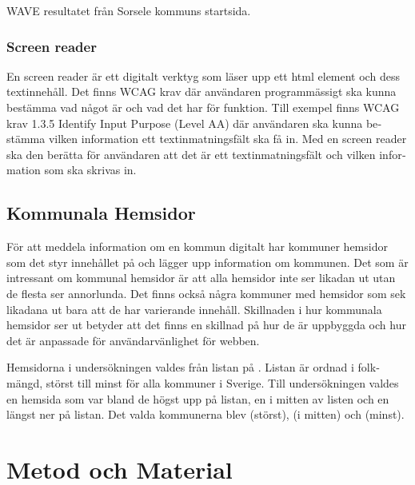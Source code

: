 \documentclass[11p]{article}
\begin{document}
\begin{otherlanguage}{swedish}
\begin{center}
    WAVE resultatet från Sorsele kommuns startsida.
    \end{center}

    \subsubsection{Screen reader}

    En screen reader är ett digitalt verktyg som läser upp ett html element och dess textinnehåll.
    Det finns WCAG krav där användaren programmässigt ska kunna bestämma vad något är och vad det har för funktion.
    Till exempel finns WCAG krav 1.3.5 Identify Input Purpose (Level AA) där användaren ska kunna bestämma vilken information ett textinmatningsfält ska få in.
    Med en screen reader ska den berätta för användaren att det är ett textinmatningsfält och vilken information som ska skrivas in.

    \subsection{Kommunala Hemsidor}
    För att meddela information om en kommun digitalt har kommuner hemsidor som det styr innehållet på och lägger upp information om kommunen.
    Det som är intressant om kommunal hemsidor är att alla hemsidor inte ser likadan ut utan de flesta ser annorlunda.
    Det finns också några kommuner med hemsidor som sek likadana ut bara att de har varierande innehåll.
    Skillnaden i hur kommunala hemsidor ser ut betyder att det finns en skillnad på hur de är uppbyggda och hur det är anpassade för användarvänlighet för webben.
    
    Hemsidorna i undersökningen valdes från listan på \textcite{SverigesKommuner}.
    Listan är ordnad i folkmängd, störst till minst för alla kommuner i Sverige.
    Till undersökningen valdes en hemsida som var bland de högst upp på listan, en i mitten av listen och en längst ner på listan.
    Det valda kommunerna blev \textcite{Linköpings_kommun} (störst), \textcite{Höörs_kommun} (i mitten) och \textcite{Sorsele_kommun} (minst).
    
    \section{Metod och Material}


\end{otherlanguage}
\end{document}
